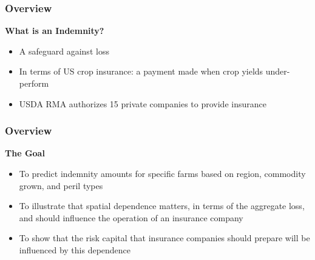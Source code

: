 \documentclass[serif,10pt,aspectratio=169]{beamer}
\begin{document}
\begin{frame}
\frametitle{Overview}
\textbf{What is an Indemnity?}
\begin{itemize}
\item A safeguard against loss
\item In terms of US crop insurance: a payment made when crop yields under-perform
\item USDA RMA authorizes 15 private companies to provide insurance
\end{itemize}
\end{frame}



\begin{frame}
\frametitle{Overview}
\textbf{The Goal}
\begin{itemize}
\item To predict indemnity amounts for specific farms based on region, commodity grown, and peril types
\item To illustrate that spatial dependence matters, in terms of the aggregate loss, and should influence the operation of an insurance company
\item To show that the risk capital that insurance companies should prepare will be influenced by this dependence
\end{itemize}
\end{frame}





\end{document}
